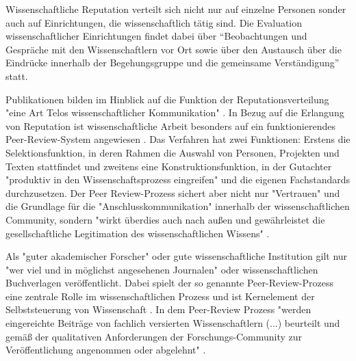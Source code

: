 Wissenschaftliche Reputation verteilt sich nicht nur auf einzelne Personen sonder auch auf Einrichtungen, die wissenschaftlich tätig sind. Die Evaluation wissenschaftlicher Einrichtungen findet dabei über “Beobachtungen und Gespräche mit den Wissenschaftlern vor Ort sowie über den Austausch über die Eindrücke innerhalb der Begehungsgruppe und die gemeinsame Verständigung”\cite{Barl_sius_2008} statt.

Publikationen bilden im Hinblick auf die Funktion der Reputationsverteilung "eine Art Telos wissenschaftlicher Kommunikation" \cite{hirschauer2004peer}. In Bezug auf die Erlangung von Reputation ist wissenschaftliche Arbeit besonders auf ein funktionierendes Peer-Review-System angewiesen \cite{Luescher_2014}. Das Verfahren hat zwei Funktionen: Erstens die Selektionsfunktion, in deren Rahmen die Auswahl von Personen, Projekten und Texten stattfindet und zweitens eine Konstruktionsfunktion, in der Gutachter "produktiv in den Wissenschaftsprozess eingreifen" \cite{Neidhardt_2010} und die eigenen Fachstandards durchzusetzen. Der Peer Review-Prozess sichert aber nicht nur "Vertrauen" und die Grundlage für die "Anschlusskommunikation" innerhalb der wissenschaftlichen Community, sondern "wirkt überdies auch nach außen und gewährleistet die gesellschaftliche Legitimation des wissenschaftlichen Wissens" \cite{pscheida_2010_wikipedia}.

Als "guter akademischer Forscher" oder gute wissenschaftliche Institution gilt nur "wer viel und in möglichst angesehenen Journalen" \cite{Frey_2005} oder wissenschaftlichen Buchverlagen veröffentlicht. Dabei spielt der so genannte Peer-Review-Prozess eine zentrale Rolle im wissenschaftlichen Prozess \cite{smith_1999_opening} und ist Kernelement der Selbststeuerung von Wissenschaft \cite{Neidhardt_2010}. In dem Peer-Review Prozess "werden eingereichte Beiträge von fachlich versierten Wissenschaftlern (...) beurteilt und gemäß der qualitativen Anforderungen der Forschungs-Community zur Veröffentlichung angenommen oder abgelehnt" \cite{Hess_2006}.

